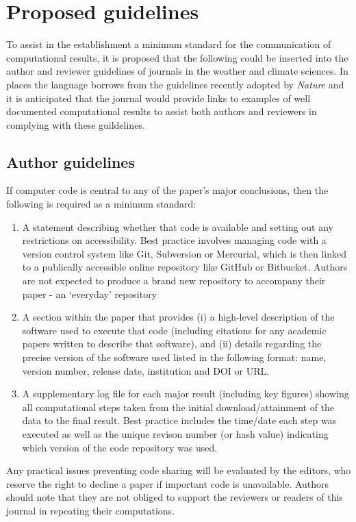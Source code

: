 \section{Proposed guidelines}\label{s:guidelines}

To assist in the establishment a minimum standard for the communication of computational results, it is proposed that the following could be inserted into the author and reviewer guidelines of journals in the weather and climate sciences. In places the language borrows from the guidelines recently adopted by \textit{Nature} \citep{Nature2014} and it is anticipated that the journal would provide links to examples of well documented computational results to assist both authors and reviewers in complying with these guildelines.

\subsection{Author guidelines}

If computer code is central to any of the paper's major conclusions, then the following is required as a minimum standard: 
\begin{enumerate}
\item A statement describing whether that code is available and setting out any restrictions on accessibility. Best practice involves managing code with a version control system like Git, Subversion or Mercurial, which is then linked to a publically accessible online repository like GitHub or Bitbucket. Authors are not expected to produce a brand new repository to accompany their paper - an `everyday' repository  
\item A section within the paper that provides (i) a high-level description of the software used to execute that code (including citations for any academic papers written to describe that software), and (ii) details regarding the precise version of the software used listed in the following format: name, version number, release date, institution and DOI or URL.
\item A supplementary log file for each major result (including key figures) showing all computational steps taken from the initial download/attainment of the data to the final result. Best practice includes the time/date each step was executed as well as the unique revison number (or hash value) indicating which version of the code repository was used.
\end{enumerate}

Any practical issues preventing code sharing will be evaluated by the editors, who reserve the right to decline a paper if important code is unavailable. Authors should note that they are not obliged to support the reviewers or readers of this journal in repeating their computations.

